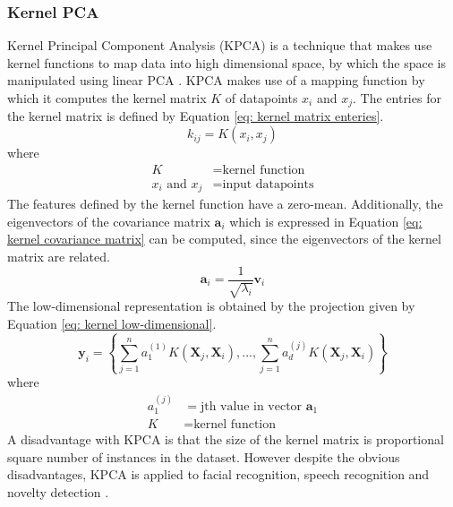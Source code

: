 \documentclass[11pt,twocolumn]{witseiepaper}
\begin{document}
	\subsubsection{Kernel PCA}
	Kernel Principal Component Analysis (KPCA) is a technique that makes use kernel functions to map data into high dimensional space, by which the space is manipulated using linear PCA \cite{Cui2012}. KPCA makes use of a mapping function by which it computes the kernel matrix $K$ of datapoints $x_i$ and $x_j$. The entries for the kernel matrix is defined by Equation \ref{eq: kernel matrix enteries}.
	\begin{equation}
		k_{ij} = K(x_i, x_j)
		\label{eq: kernel matrix enteries}
	\end{equation}
	where
	\begin{align*}
		K &= \text{kernel function}\\
		x_i \text{ and } x_j &= \text{input datapoints}
	\end{align*}
	The features defined by the kernel function have a zero-mean. Additionally, the eigenvectors of the covariance matrix $\textbf{a}_i$ which is expressed in Equation \ref{eq: kernel covariance matrix} can be computed, since the eigenvectors of the kernel matrix are related.
	\begin{equation}
		\textbf{a}_i = \frac{1}{\sqrt{\lambda_i}} \textbf{v}_i
		\label{eq: kernel covariance matrix}
	\end{equation}
	The low-dimensional representation is obtained by the projection given by Equation \ref{eq: kernel low-dimensional}.
	\begin{equation}
		\textbf{y}_i = \left\{ \sum_{j = 1}^{n}a_1^{(1)}K(\textbf{X}_j, \textbf{X}_i), ... , \sum_{j = 1}^{n}a_d^{(j)}K(\textbf{X}_j, \textbf{X}_i) \right\}
		\label{eq: kernel low-dimensional}
	\end{equation}
	where
	\begin{align*}
		a_1^{(j)} &= \text{jth value in vector }\textbf{a}_1\\
		K &= \text{kernel function}
	\end{align*}
	A disadvantage with KPCA is that the size of the kernel matrix is proportional square number of instances in the dataset. However despite the obvious disadvantages, KPCA is applied to facial recognition, speech recognition and novelty detection \cite{van2009dimensionality}.
	
\end{document}
